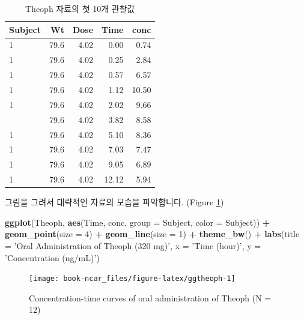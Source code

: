 \documentclass[12pt,]{krantz}
\newenvironment{Shaded}{\begin{snugshade}}{\end{snugshade}}
\newcommand{\KeywordTok}[1]{\textcolor[rgb]{0.13,0.29,0.53}{\textbf{#1}}}
\newcommand{\DataTypeTok}[1]{\textcolor[rgb]{0.13,0.29,0.53}{#1}}
\newcommand{\DecValTok}[1]{\textcolor[rgb]{0.00,0.00,0.81}{#1}}
\newcommand{\StringTok}[1]{\textcolor[rgb]{0.31,0.60,0.02}{#1}}
\newcommand{\OperatorTok}[1]{\textcolor[rgb]{0.81,0.36,0.00}{\textbf{#1}}}
\newcommand{\NormalTok}[1]{#1}
\theoremstyle{definition}
\theoremstyle{definition}
\theoremstyle{definition}
\theoremstyle{remark}
\begin{document}
\begin{table}

\caption{\label{tab:head}Theoph 자료의 첫 10개 관찰값}
\centering
\begin{tabular}[t]{lrrrr}
\toprule
Subject & Wt & Dose & Time & conc\\
\midrule
1 & 79.6 & 4.02 & 0.00 & 0.74\\
1 & 79.6 & 4.02 & 0.25 & 2.84\\
1 & 79.6 & 4.02 & 0.57 & 6.57\\
1 & 79.6 & 4.02 & 1.12 & 10.50\\
1 & 79.6 & 4.02 & 2.02 & 9.66\\
\addlinespace
1 & 79.6 & 4.02 & 3.82 & 8.58\\
1 & 79.6 & 4.02 & 5.10 & 8.36\\
1 & 79.6 & 4.02 & 7.03 & 7.47\\
1 & 79.6 & 4.02 & 9.05 & 6.89\\
1 & 79.6 & 4.02 & 12.12 & 5.94\\
\bottomrule
\end{tabular}
\end{table}

그림을 그려서 대략적인 자료의 모습을 파악합니다. (Figure
\ref{fig:ggtheoph})

\begin{Shaded}
\begin{Highlighting}[]
\KeywordTok{ggplot}\NormalTok{(Theoph, }\KeywordTok{aes}\NormalTok{(Time, conc, }\DataTypeTok{group =}\NormalTok{ Subject, }\DataTypeTok{color =}\NormalTok{ Subject)) }\OperatorTok{+}
\StringTok{  }\KeywordTok{geom_point}\NormalTok{(}\DataTypeTok{size =} \DecValTok{4}\NormalTok{) }\OperatorTok{+}\StringTok{ }
\StringTok{  }\KeywordTok{geom_line}\NormalTok{(}\DataTypeTok{size =} \DecValTok{1}\NormalTok{) }\OperatorTok{+}
\StringTok{  }\KeywordTok{theme_bw}\NormalTok{() }\OperatorTok{+}
\StringTok{  }\KeywordTok{labs}\NormalTok{(}\DataTypeTok{title =} \StringTok{'Oral Administration of Theoph (320 mg)'}\NormalTok{,}
       \DataTypeTok{x =} \StringTok{'Time (hour)'}\NormalTok{, }\DataTypeTok{y =} \StringTok{'Concentration (ng/mL)'}\NormalTok{)}
\end{Highlighting}
\end{Shaded}

\begin{figure}
\texttt{[image: book-ncar\_files/figure-latex/ggtheoph-1]} \caption{Concentration-time curves of oral administration of Theoph (N = 12)}\label{fig:ggtheoph}
\end{figure}
\end{document}
